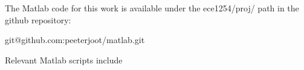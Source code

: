 %
%
\label{appendix:matlab}
The Matlab code for this work is available under the ece1254/proj/ path in the github repository:
\begin{center}
git@github.com:peeterjoot/matlab.git
\end{center}

Relevant Matlab scripts include

